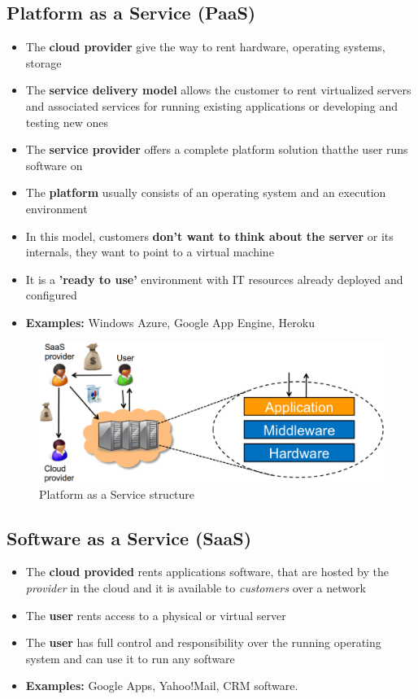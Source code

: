 \subsection{Platform as a Service (PaaS)}
\begin{itemize}
    \item The \textbf{cloud provider} give the way to rent hardware, operating systems, storage
    \item The \textbf{service delivery model} allows the customer to rent virtualized servers and associated services for running existing applications or developing and testing new ones
    \item The \textbf{service provider} offers a complete platform solution thatthe user runs software on
    \item The \textbf{platform} usually consists of an operating system and an execution environment
    \item  In this model, customers \textbf{don’t want to think about the server} or its internals, they want to point to a virtual machine
    \item  It is a \textbf{’ready to use’} environment with IT resources already deployed and configured
    \item \textbf{Examples:} Windows Azure, Google App Engine, Heroku
\end{itemize}

\begin{figure}[!h]
    \centering
    \includegraphics[width=.60\linewidth]{images/CloudComputing/paas.png}
    \caption{Platform as a Service structure}
\end{figure}

\subsection{Software as a Service (SaaS)}
\begin{itemize}
    \item The \textbf{cloud provided} rents applications software, that are hosted by the \textit{provider} in the cloud and it is available to \textit{customers} over a network
    \item The \textbf{user} rents access to a physical or virtual server
    \item The \textbf{user} has full control and responsibility over the running operating system and can use it to run any software
    \item \textbf{Examples:} Google Apps, Yahoo!Mail, CRM software.
\end{itemize}

